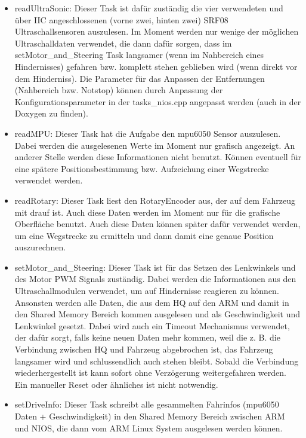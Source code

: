 \begin{itemize}
  \item readUltraSonic: Dieser Task ist dafür zuständig die vier verwendeten und über IIC angeschlossenen (vorne zwei, hinten zwei) SRF08 Ultraschallsensoren auszulesen. Im Moment werden nur wenige der möglichen Ultraschalldaten verwendet, die dann dafür sorgen, dass im setMotor\_and\_Steering Task langsamer (wenn im Nahbereich eines Hindernisses) gefahren bzw. komplett stehen geblieben wird (wenn direkt vor dem Hinderniss). Die Parameter für das Anpassen der Entfernungen (Nahbereich bzw. Notstop) können durch Anpassung der Konfigurationsparameter in der tasks\_nios.cpp angepasst werden (auch in der Doxygen zu finden).
  \item readMPU: Dieser Task hat die Aufgabe den mpu6050 Sensor auszulesen. Dabei werden die ausgelesenen Werte im Moment nur grafisch angezeigt. An anderer Stelle werden diese Informationen nicht benutzt. Können eventuell für eine spätere Positionsbestimmung bzw. Aufzeichung einer Wegstrecke verwendet werden.
  \item readRotary: Dieser Task liest den RotaryEncoder aus, der auf dem Fahrzeug mit drauf ist. Auch diese Daten werden im Moment nur für die grafische Oberfläche benutzt. Auch diese Daten können später dafür verwendet werden, um eine Wegstrecke zu ermitteln und dann damit eine genaue Position auszurechnen.
  \item setMotor\_and\_Steering: Dieser Task ist für das Setzen des Lenkwinkels und des Motor PWM Signals zuständig. Dabei werden die Informationen aus den Ultraschallmodulen verwendet, um auf Hindernisse reagieren zu können. Ansonsten werden alle Daten, die aus dem HQ auf den ARM und damit in den Shared Memory Bereich kommen ausgelesen und als Geschwindigkeit und Lenkwinkel gesetzt. Dabei wird auch ein Timeout Mechanismus verwendet, der dafür sorgt, falls keine neuen Daten mehr kommen, weil die z. B. die Verbindung zwischen HQ und Fahrzeug abgebrochen ist, das Fahrzeug langsamer wird und schlussendlich auch stehen bleibt. Sobald die Verbindung wiederhergestellt ist kann sofort ohne Verzögerung weitergefahren werden. Ein manueller Reset oder ähnliches ist nicht notwendig.
  \item setDriveInfo: Dieser Task schreibt alle gesammelten Fahrinfos (mpu6050 Daten + Geschwindigkeit) in den Shared Memory Bereich zwischen ARM und NIOS, die dann vom ARM Linux System ausgelesen werden können.
 \end{itemize}
